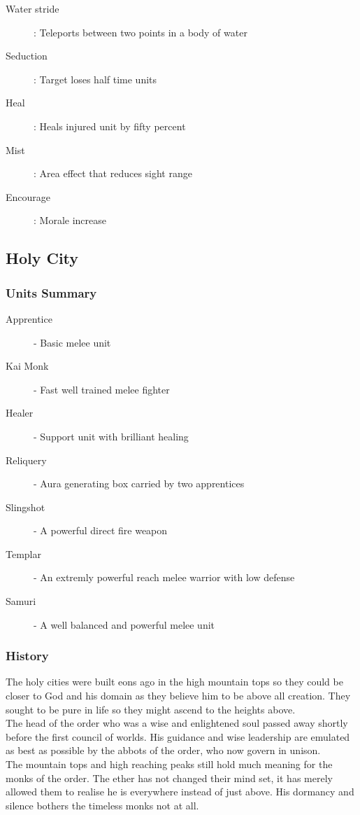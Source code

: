 \documentclass[a4paper,twocolumn]{article}
\begin{document}
\begin{description}
\item[Water stride]: Teleports between two points in a body of water
\item[Seduction]: Target loses half time units
\item[Heal]: Heals injured unit by fifty percent
\item[Mist]: Area effect that reduces sight range
\item[Encourage]: Morale increase
\end{description}

\subsection{Holy City}

\subsubsection{Units Summary}

\begin{description}
\item[Apprentice] - Basic melee unit
\item[Kai Monk] - Fast well trained melee fighter
\item[Healer] - Support unit with brilliant healing
\item[Reliquery] - Aura generating box carried by two apprentices
\item[Slingshot] - A powerful direct fire weapon

\item[Templar] - An extremly powerful reach melee warrior with low defense
\item[Samuri] - A well balanced and powerful melee unit
\end{description}

\subsubsection{History}

The holy cities were built eons ago in the high mountain tops so they could be closer to God and his domain as they believe him to be above all creation. They sought to be pure in life so they might ascend to the heights above.\\
The head of the order who was a wise and enlightened soul passed away shortly before the first council of worlds. His guidance and wise leadership are emulated as best as possible by the abbots of the order, who now govern in unison.\\
The mountain tops and high reaching peaks still hold much meaning for the monks of the order. The ether has not changed their mind set, it has merely allowed them to realise he is everywhere instead of just above. His dormancy and silence bothers the timeless monks not at all.
\end{document}
